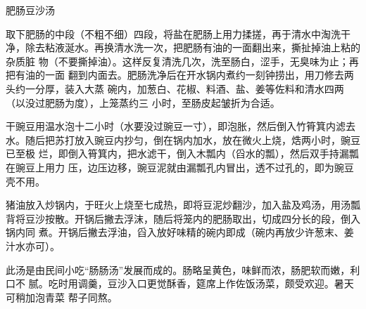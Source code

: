 \begin{recipe}{肥肠豆沙汤}

\ingredients


\preparation

\step 取下肥肠的中段（不粗不细）四段，将盐在肥肠上用力揉搓，再于清水中淘洗干
净，除去粘液涎水。再换清水洗一次，把肥肠有油的一面翻出来，撕扯掉油上粘的杂质脏
物（不要撕掉油）。这样反复清洗几次，洗至肠白，涩手，无臭味为止；再把有油的一面
翻到内面去。肥肠洗净后在开水锅内煮约一刻钟捞出，用刀修去两头约一分厚，装入大蒸
碗内，加葱白、花椒、料酒、盐、姜等佐料和清水四两（以没过肥肠为度），上笼蒸约三
小时，至肠皮起皱折为合适。

\step 干豌豆用温水泡十二小时（水要没过豌豆一寸），即泡胀，然后倒入竹筲箕内滤去
水。随后把苏打放入豌豆内抄匀，倒在锅内加水，放在微火上烧，焅两小时，豌豆已至极
烂，即倒入筲箕内，把水滤干，倒入木瓢内（舀水的瓢），然后双手持漏瓢在豌豆上用力
压，边压边移，豌豆泥就由漏瓢孔内冒出，透不过孔的，即为豌豆壳不用。

\step 猪油放入炒锅内，于旺火上烧至七成热，即将豆泥炒翻沙，加入盐及鸡汤，用汤瓢
背将豆沙按散。开锅后撇去浮沫，随后将笼内的肥肠取出，切成四分长的段，倒入锅内同
煮。开锅后撇去浮油，舀入放好味精的碗内即成（碗内再放少许葱末、姜汁水亦可）。

\features

此汤是由民间小吃“肠肠汤”发展而成的。肠略呈黄色，味鲜而浓，肠肥软而嫩，利口不
腻。吃时用调羹，豆沙入口更觉酥香，筵席上作佐饭汤菜，颇受欢迎。暑天可稍加泡青菜
帮子同熬。

\end{recipe}

